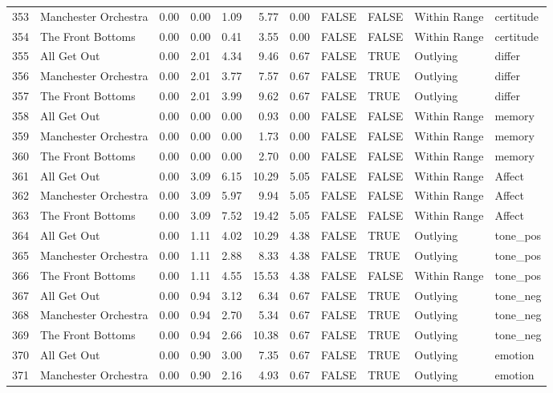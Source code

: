 \begin{table}[ht]
\begin{tabular}{rlrrrrrllll}
  353 & Manchester Orchestra & 0.00 & 0.00 & 1.09 & 5.77 & 0.00 & FALSE & FALSE & Within Range & certitude \\ 
  354 & The Front Bottoms & 0.00 & 0.00 & 0.41 & 3.55 & 0.00 & FALSE & FALSE & Within Range & certitude \\ 
  355 & All Get Out & 0.00 & 2.01 & 4.34 & 9.46 & 0.67 & FALSE & TRUE & Outlying & differ \\ 
  356 & Manchester Orchestra & 0.00 & 2.01 & 3.77 & 7.57 & 0.67 & FALSE & TRUE & Outlying & differ \\ 
  357 & The Front Bottoms & 0.00 & 2.01 & 3.99 & 9.62 & 0.67 & FALSE & TRUE & Outlying & differ \\ 
  358 & All Get Out & 0.00 & 0.00 & 0.00 & 0.93 & 0.00 & FALSE & FALSE & Within Range & memory \\ 
  359 & Manchester Orchestra & 0.00 & 0.00 & 0.00 & 1.73 & 0.00 & FALSE & FALSE & Within Range & memory \\ 
  360 & The Front Bottoms & 0.00 & 0.00 & 0.00 & 2.70 & 0.00 & FALSE & FALSE & Within Range & memory \\ 
  361 & All Get Out & 0.00 & 3.09 & 6.15 & 10.29 & 5.05 & FALSE & FALSE & Within Range & Affect \\ 
  362 & Manchester Orchestra & 0.00 & 3.09 & 5.97 & 9.94 & 5.05 & FALSE & FALSE & Within Range & Affect \\ 
  363 & The Front Bottoms & 0.00 & 3.09 & 7.52 & 19.42 & 5.05 & FALSE & FALSE & Within Range & Affect \\ 
  364 & All Get Out & 0.00 & 1.11 & 4.02 & 10.29 & 4.38 & FALSE & TRUE & Outlying & tone\_pos \\ 
  365 & Manchester Orchestra & 0.00 & 1.11 & 2.88 & 8.33 & 4.38 & FALSE & TRUE & Outlying & tone\_pos \\ 
  366 & The Front Bottoms & 0.00 & 1.11 & 4.55 & 15.53 & 4.38 & FALSE & FALSE & Within Range & tone\_pos \\ 
  367 & All Get Out & 0.00 & 0.94 & 3.12 & 6.34 & 0.67 & FALSE & TRUE & Outlying & tone\_neg \\ 
  368 & Manchester Orchestra & 0.00 & 0.94 & 2.70 & 5.34 & 0.67 & FALSE & TRUE & Outlying & tone\_neg \\ 
  369 & The Front Bottoms & 0.00 & 0.94 & 2.66 & 10.38 & 0.67 & FALSE & TRUE & Outlying & tone\_neg \\ 
  370 & All Get Out & 0.00 & 0.90 & 3.00 & 7.35 & 0.67 & FALSE & TRUE & Outlying & emotion \\ 
  371 & Manchester Orchestra & 0.00 & 0.90 & 2.16 & 4.93 & 0.67 & FALSE & TRUE & Outlying & emotion \\ 

\end{tabular}
\end{table}
